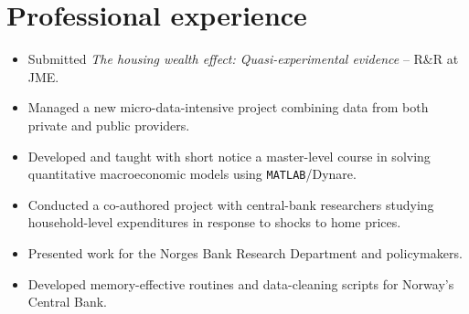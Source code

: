 \documentclass{clean_CV}
\begin{document}
\section{Professional experience%
}


\begin{itemize}
    \item Submitted \textit{The housing wealth effect: Quasi-experimental evidence} -- R\&R at JME.
    \item Managed a new micro-data-intensive project combining data from both private and public providers.
    \item Developed and taught with short notice a master-level course in solving quantitative macroeconomic models using \texttt{MATLAB}/Dynare.
\end{itemize}

\medskip

\begin{itemize}
    \item Conducted a co-authored project with central-bank researchers studying household-level expenditures in response to shocks to home prices. %
    \item Presented work for the Norges Bank Research Department and policymakers.
    \item Developed memory-effective routines and data-cleaning scripts for Norway's Central Bank. %
\end{itemize}

\medskip

\end{document}
